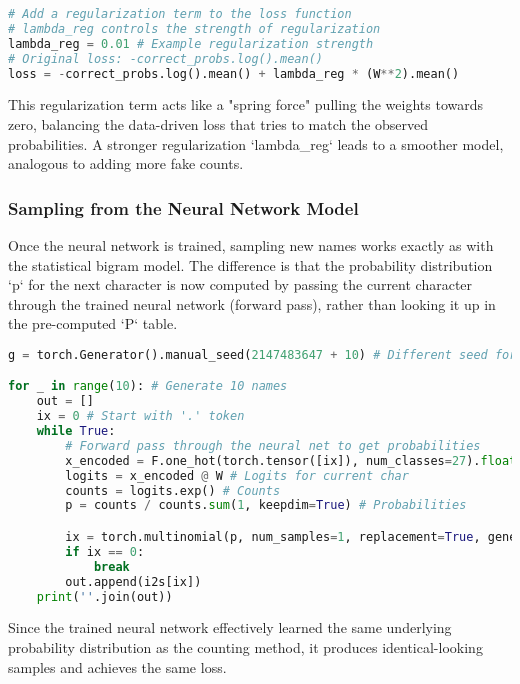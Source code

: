 \begin{lstlisting}[language=Python, caption=L2 Regularization for Smoothing]
# Add a regularization term to the loss function
# lambda_reg controls the strength of regularization
lambda_reg = 0.01 # Example regularization strength
# Original loss: -correct_probs.log().mean()
loss = -correct_probs.log().mean() + lambda_reg * (W**2).mean()
\end{lstlisting}

This regularization term acts like a "spring force" pulling the weights towards zero, balancing the data-driven loss that tries to match the observed probabilities. A stronger regularization `lambda_reg` leads to a smoother model, analogous to adding more fake counts.

\subsubsection{Sampling from the Neural Network Model}
Once the neural network is trained, sampling new names works exactly as with the statistical bigram model. The difference is that the probability distribution `p` for the next character is now computed by passing the current character through the trained neural network (forward pass), rather than looking it up in the pre-computed `P` table.

\begin{lstlisting}[language=Python, caption=Sampling from the Trained Neural Network]
g = torch.Generator().manual_seed(2147483647 + 10) # Different seed for different samples

for _ in range(10): # Generate 10 names
    out = []
    ix = 0 # Start with '.' token
    while True:
        # Forward pass through the neural net to get probabilities
        x_encoded = F.one_hot(torch.tensor([ix]), num_classes=27).float() # Input single character
        logits = x_encoded @ W # Logits for current char
        counts = logits.exp() # Counts
        p = counts / counts.sum(1, keepdim=True) # Probabilities

        ix = torch.multinomial(p, num_samples=1, replacement=True, generator=g).item() # Sample
        if ix == 0:
            break
        out.append(i2s[ix])
    print(''.join(out))
\end{lstlisting}

Since the trained neural network effectively learned the same underlying probability distribution as the counting method, it produces identical-looking samples and achieves the same loss.

